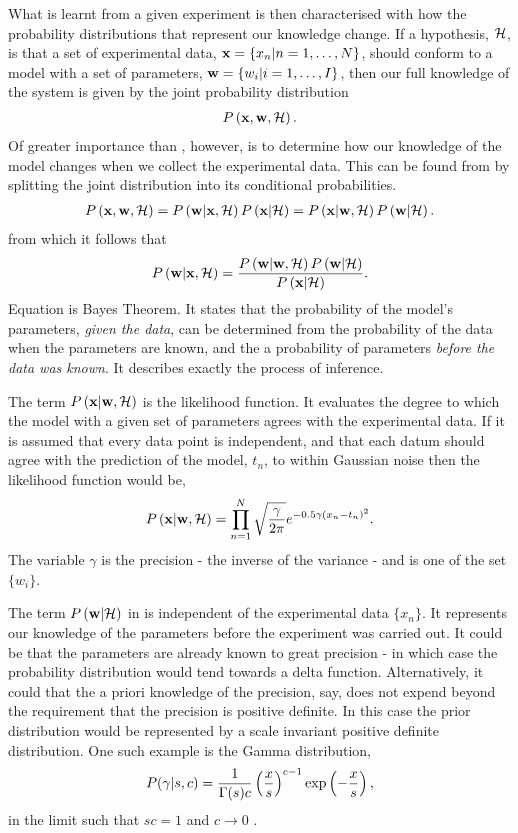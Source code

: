 What is learnt from a given experiment is then characterised with how the probability distributions
that represent our knowledge change.
If a hypothesis, ${\cal H}$, is that a set of experimental data, $\mathbf{x} = \{x_n|n=1,\ldots,N\}$, should conform to a model with a set of parameters, $\mathbf{w} = \{w_i| i=1,\ldots,I\}$,
then our full knowledge of the system is given by the joint probability distribution
\begin{align}
  P\left( \mathbf{x},\mathbf{w},{\cal H} \right).
  \label{eqn:fullJointDist}
\end{align}
Of greater importance than , however,
is to determine how our knowledge of the model changes when we collect the experimental data.
This can be found from   by splitting the joint distribution into its conditional probabilities.
\begin{align}
  P\left( \mathbf{x},\mathbf{w},{\cal H} \right) = P\left( \mathbf{w}|\mathbf{x},{\cal H} \right)P\left( \mathbf{x}|{\cal H} \right)
  =  P\left( \mathbf{x}|\mathbf{w},{\cal H} \right) P\left( \mathbf{w}|{\cal H} \right).
\end{align}
from which it follows that 
\begin{align}
   P\left( \mathbf{w}|\mathbf{x},{\cal H} \right) =  \frac{P\left( \mathbf{w}|\mathbf{w},{\cal H} \right) P\left( \mathbf{w}|{\cal H} \right)}{P\left( \mathbf{x}|{\cal H} \right)}.
  \label{eqn:BayesTheorem}
\end{align}
Equation  is Bayes Theorem.
It states that the probability of the model's parameters, {\em given the data},
can be determined from the probability of the data when the parameters are known, and the a  probability of parameters {\em before the data was known}.
It describes exactly the process of inference.

The term $P\left( \mathbf{x}|\mathbf{w},{\cal H} \right)$ is the likelihood function.
It evaluates the degree to which the model with a given set of parameters agrees with the experimental data.
If it is assumed that every data point is independent, and that each datum should agree with the prediction of the model, $t_n$, 
to within Gaussian noise
then the likelihood function would be,
\begin{align}
  P\left( \mathbf{x}|\mathbf{w},{\cal H} \right) = \prod_{n=1}^N \sqrt{\frac{\gamma}{2\pi}}e^{-0.5\gamma\left( x_n-t_n \right)^2}.
\end{align}
The variable $\gamma$ is the precision - the inverse of the variance - and is one of the set $\{w_i\}$.

The term $P\left( \mathbf{w}|{\cal H} \right)$ in  is independent of the experimental data $\{x_n\}$.  
It  represents our knowledge of the parameters before the experiment was carried out.
It could be that the parameters are already known to great precision - 
in which case the probability distribution would tend towards a delta function.
Alternatively, it could that the a priori knowledge of the precision, say, 
does not expend beyond the requirement that the precision is positive definite.
In this case the prior distribution would be represented by a scale invariant positive definite distribution.
One such example is the Gamma distribution,
\begin{align}
  P(\gamma|s,c) = \frac{1}{\Gamma(s)c}\left( \frac{x}{s} \right)^{c-1}\exp\left( -\frac{x}{s} \right),
\label{eqn:Gamma}
\end{align}
in the limit such that $sc = 1$ and $c\rightarrow 0$ \cite{MacKay2003}.

